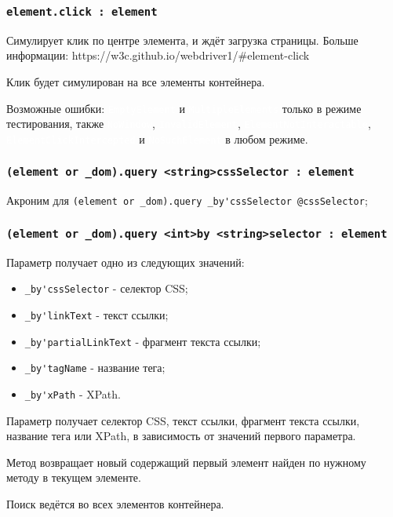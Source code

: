 \documentclass[a4paper, 14pt]{extarticle}
\newcommand{\ferror}[1]{{\fontsize{11pt}{12pt} \tt \colorbox{function}{\textcolor{white}{#1}}}}
\newenvironment{icItems}
	{ \begin{itemize} [noitemsep,nolistsep] }
	{ \end{itemize} }
\begin{document}
\subsubsection{\lstinline|element.click : element|}

Симулирует клик по центре элемента, и ждёт загрузка страницы. Больше информации: https://w3c.github.io/webdriver1/\#element-click

\code{[icL]} Клик будет симулирован на все элементы контейнера.

Возможные ошибки: \ferror{EmptyElement} и \ferror{MultipleElements} только в режиме тестирования, также \ferror{NoWindow}, \ferror{InvalidElement}, \ferror{ElementNotInteractable}, \ferror{ElementClickIntercepted} и \ferror{NoSuchElement} в любом режиме.

\subsubsection{\lstinline|(element or _dom).query <string>cssSelector : element|}

Акроним для \lstinline|(element or _dom).query _by'cssSelector @cssSelector|; 

\subsubsection{\lstinline|(element or _dom).query <int>by <string>selector : element|}

Параметр  получает одно из следующих значений:
\begin{icItems}
	\item \lstinline|_by'cssSelector| - селектор CSS;
	\item \lstinline|_by'linkText| - текст ссылки;
	\item \lstinline|_by'partialLinkText| - фрагмент текста ссылки;
	\item \lstinline|_by'tagName| - название тега;
	\item \lstinline|_by'xPath| - XPath.
\end{icItems}

Параметр  получает селектор CSS, текст ссылки, фрагмент текста ссылки, название тега или XPath, в зависимость от значений первого параметра.

Метод возвращает новый \element{} содержащий первый элемент найден по нужному методу в текущем элементе.

\code{[icL]} Поиск ведётся во всех элементов контейнера.
\end{document}
